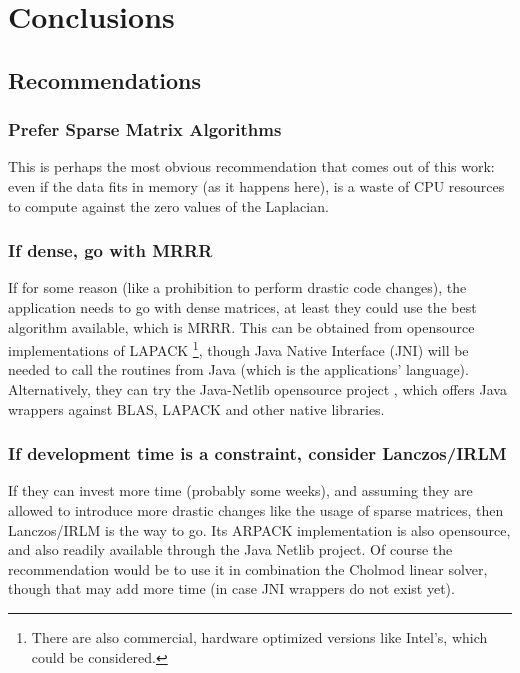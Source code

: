 \chapter{Conclusions}
\label{cha:conclu}

\section{Recommendations}

\subsection{Prefer Sparse Matrix Algorithms}

This is perhaps the most obvious recommendation that comes out of this
work: even if the data fits in memory (as it happens here), is a waste
of CPU resources to compute against the zero values of the \gls{Laplacian}.

\subsection{If dense, go with \gls{MRRR}}

If for some reason (like a prohibition to perform drastic code
changes), the application needs to go with dense matrices, at least
they could use the best algorithm available, which is \gls{MRRR}. This can
be obtained from opensource implementations of LAPACK \footnote{There
  are also commercial, hardware optimized versions like Intel's, which
  could be considered.}, though Java
Native Interface (JNI) will be needed to call the routines from Java (which
is the applications' language). Alternatively, they can try the
Java-Netlib opensource project \cite{jnetlib}, which offers Java
wrappers against BLAS, LAPACK and other native libraries.

\subsection{If development time is a constraint, consider Lanczos/\gls{IRLM}}

If they can invest more time (probably some weeks), and assuming
they are allowed to introduce more drastic changes like the usage of
sparse matrices, then Lanczos/\gls{IRLM} is the way to go. Its ARPACK
implementation is also opensource, and also readily available through
the Java Netlib project. Of course the recommendation would be to use
it in combination
the \gls{Cholmod} linear solver, though that may add more time (in case JNI
wrappers do not exist yet).

